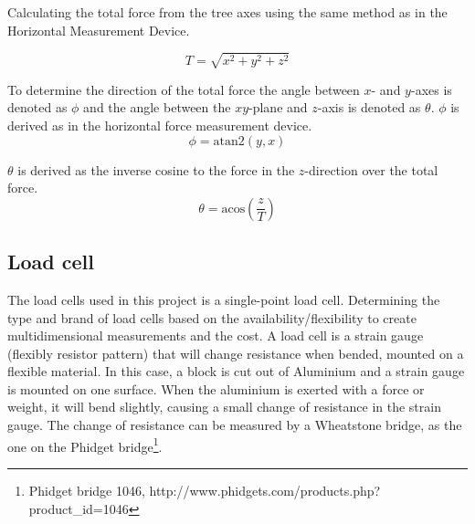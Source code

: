 \noindent
Calculating the total force from the tree axes using the same method as in the Horizontal Measurement Device.

\begin{equation}
T = \sqrt{x^2+y^2+z^2}
\end{equation} 

\noindent
To determine the direction of the total force the angle between $x$- and $y$-axes is denoted as $\phi$ and the angle between the $xy$-plane and $z$-axis is denoted as $\theta$.
$\phi$ is derived as in the horizontal force measurement device.
\begin{equation}
\phi = \mathrm{atan2}(y,x)
\end{equation}

\noindent
$\theta$ is derived as the inverse cosine to the force in the $z$-direction over the total force.
\begin{equation}
\theta = \mathrm{acos}\left( \frac{z}{T} \right)
\end{equation}

\subsection{Load cell}
The load cells used in this project is a single-point load cell. Determining the type and brand of load cells based on the availability/flexibility to create multidimensional measurements and the cost. A load cell is a strain gauge (flexibly resistor pattern) that will change resistance when bended, mounted on a flexible material. In this case, a block is cut out of Aluminium and a strain gauge is mounted on one surface. When the aluminium is exerted with a force or weight, it will bend slightly, causing a small change of resistance in the strain gauge. The change of resistance can be measured by a Wheatstone bridge, as the one on the Phidget bridge\footnote{Phidget bridge 1046, http://www.phidgets.com/products.php?product\_id=1046}.

